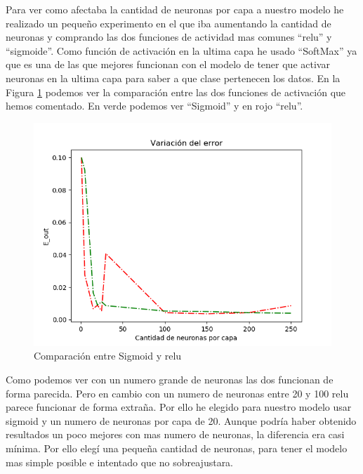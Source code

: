 \documentclass[12pt,a4paper]{article}
\begin{document}
Para ver como afectaba la cantidad de neuronas por capa a nuestro modelo he realizado un pequeño experimento en el que iba aumentando la cantidad de neuronas y comprando las dos funciones de actividad mas comunes ``relu'' y ``sigmoide''. Como función de activación en la ultima capa he usado ``SoftMax'' ya que es una de las que mejores funcionan con el modelo de tener que activar neuronas en la ultima capa para saber a que clase pertenecen los datos. En la Figura \ref{fig:comparacionReuluSigmo} podemos ver la comparación entre las dos funciones de activación que hemos comentado. En verde podemos ver ``Sigmoid'' y en rojo ``relu''. 
\begin{figure}[H]
	\centering
	\includegraphics[width=0.7\linewidth]{images/comparacionreluSigmo.png}
	\caption[Comparación entre Sigmoid y relu]{Comparación entre Sigmoid y relu}
	\label{fig:comparacionReuluSigmo}
\end{figure}
Como podemos ver con un numero grande de neuronas las dos funcionan de forma parecida. Pero en cambio con un numero de neuronas entre 20 y 100 relu parece funcionar de forma extraña. Por ello he elegido para nuestro modelo usar sigmoid  y un numero de neuronas por capa de 20. Aunque podría haber obtenido resultados un poco mejores con mas numero de neuronas, la diferencia era casi mínima. Por ello elegí una pequeña cantidad de neuronas, para tener el modelo mas simple posible e intentado que no sobreajustara.
\end{document}
